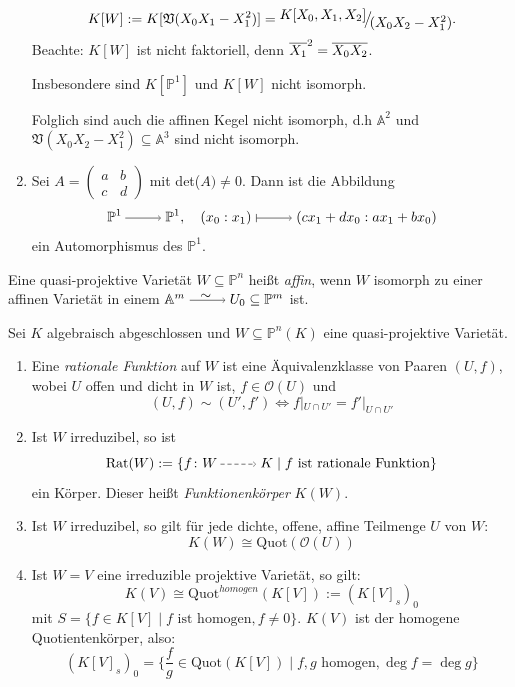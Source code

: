 \documentclass[a4paper,12pt]{scrbook}
\def\A{\mathbb{A}}
\def\V{\mathfrak{V}}
\def\O{\mathcal{O}}
\def\P{\mathbb{P}}
\newcommand{\Rat}{\mathrm{Rat}}
\newcommand{\Quot}{\mathrm{Quot}}
\newcommand{\restrict}[1]{|_{#1}}
\newcommand{\ra}{\raisebox{-1pt}{\tikz{\draw[thin,shorten >=3pt, ->] (0,0) node{\hspace*{-2pt}} -- node{} (1,0);}}\penalty1000\relax}
\renewcommand{\mapsto}{\raisebox{-1pt}{\tikz{\draw[thin,shorten >=3pt, |->] (0,0) node{\hspace*{0pt}} -- node{} (1,0);}}\penalty1000\relax}
\newcommand{\isom}{\raisebox{-1pt}{\tikz{\draw[thin,shorten >=3pt, ->] (0,0) node{\hspace*{0pt}} -- node{} (1,0);\draw (0.4,0.1)
    node {$\sim$};}}\penalty1000\relax}
\newcommand{\ppf}{\raisebox{-1pt}{\tikz{\draw[densely dashed,thin,shorten >=3pt, ->] (0,0) node{\hspace*{-2pt}} -- node{} (1,0);}}\penalty1000\relax}
\def\Bar#1{\ensuremath\overline{#1}}
\newcommand{\Quotient}[2]{
  \mathchoice
  { %
    \raisebox{0.7ex}{\ensuremath{#1}}
    \ensuremath{\mkern-3mu}\big/\ensuremath{\mkern-3mu}
    \raisebox{-0.6ex}{\ensuremath{#2}}
  }
  { %
    #1/#2
  }
  { %
    #1/#2
  }
  { %
    #1/#2
  }
}
\begin{document}
\begin{bsp}
\begin{enumerate}
\[K[W]:=K[\V(X_0X_1-X_1^2)]=\Quotient{K[X_0,X_1,X_2]}{(X_0X_2-X_1^2)}.\]
Beachte: $K[W]$ ist nicht faktoriell, denn $\Bar{X_1}^2=\Bar{X_0X_2}$.

Insbesondere sind $K[\P^1]$ und $K[W]$ nicht isomorph.

Folglich sind auch die affinen Kegel nicht isomorph, d.h $\A^2$ und $\V(X_0X_2-X_1^2)\subseteq \A^3$ sind nicht isomorph.
  \item{} Sei $A=\begin{pmatrix} a&b\\c&d \end{pmatrix}$ mit det($A)\neq 0$. Dann ist die Abbildung 
\[\P^1\ra \P^1, \quad (x_0:x_1)\mapsto (cx_1+dx_0:ax_1+bx_0)\]
ein Automorphismus des $\P^1$.
\end{enumerate}
\end{bsp}

\begin{dfn}\label{2.6.4}
Eine quasi-projektive Varietät $W\subseteq \P^n$ heißt \emph{affin}, wenn $W$ isomorph zu einer affinen Varietät in einem $\A^m \isom U_0\subseteq \P^m$ ist.
\end{dfn}

\begin{db}\label{2.6.5}
 Sei $K$ algebraisch abgeschlossen und $W\subseteq \P^n(K)$ eine quasi-projektive Varietät.
\begin{enumerate}
  \item{} Eine \emph{rationale Funktion} auf $W$ ist eine Äquivalenzklasse von Paaren $(U,f)$, wobei $U$ offen und dicht in $W$ ist, $f\in \O(U)$ und
  \[(U,f)\sim (U',f') \iff f\restrict{U\cap U'}=f'\restrict{U\cap U'}\]
  \item{} Ist $W$ irreduzibel, so ist 
  \[\Rat(W):=\{f\colon W \ppf K \mid f \text{ ist rationale Funktion}\}\]
  ein Körper. Dieser heißt \emph{Funktionenkörper} $K(W)$. 
  \item{} Ist $W$ irreduzibel, so gilt für jede dichte, offene, affine Teilmenge $U$ von $W$:
\[K(W)\cong \Quot(\O(U))\]
  \item{} Ist $W=V$ eine irreduzible projektive Varietät, so gilt:
\[K(V)\cong \Quot^{homogen}(K[V]):=(K[V]_s)_0\] 
mit $S=\{f\in K[V] \mid f \text{ ist homogen}, f\neq 0 \}$. $K(V)$ ist der homogene Quotientenkörper, also:
\[(K[V]_s)_0=\{\frac{f}{g} \in \Quot(K[V]) \mid f,g \text{ homogen}, \deg f=\deg g\}\]
\end{enumerate}
\end{db}
\end{document}
